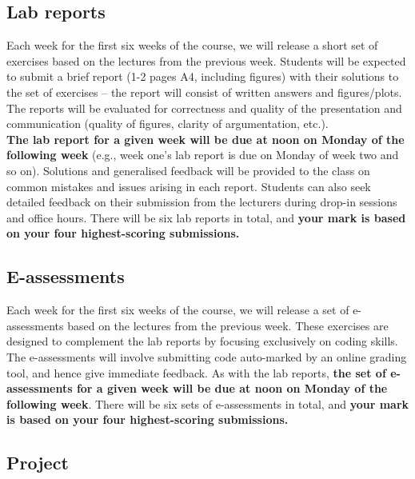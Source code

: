 \documentclass[
  letterpaper,
  DIV=11,
  numbers=noendperiod]{scrreprt}
\begin{document}
\subsection*{Lab reports}\label{lab-reports}

Each week for the first six weeks of the course, we will release a short
set of exercises based on the lectures from the previous week. Students
will be expected to submit a brief report (1-2 pages A4, including
figures) with their solutions to the set of exercises -- the report will
consist of written answers and figures/plots. The reports will be
evaluated for correctness and quality of the presentation and
communication (quality of figures, clarity of argumentation, etc.).\\
\textbf{The lab report for a given week will be due at noon on Monday of
the following week} (e.g., week one's lab report is due on Monday of
week two and so on). Solutions and generalised feedback will be provided
to the class on common mistakes and issues arising in each report.
Students can also seek detailed feedback on their submission from the
lecturers during drop-in sessions and office hours. There will be six
lab reports in total, and \textbf{your mark is based on your four
highest-scoring submissions.}

\subsection*{E-assessments}\label{e-assessments}

Each week for the first six weeks of the course, we will release a set
of e-assessments based on the lectures from the previous week. These
exercises are designed to complement the lab reports by focusing
exclusively on coding skills. The e-assessments will involve submitting
code auto-marked by an online grading tool, and hence give immediate
feedback. As with the lab reports, \textbf{the set of e-assessments for
a given week will be due at noon on Monday of the following week}. There
will be six sets of e-assessments in total, and \textbf{your mark is
based on your four highest-scoring submissions.}

\subsection*{Project}\label{project}
\end{document}
